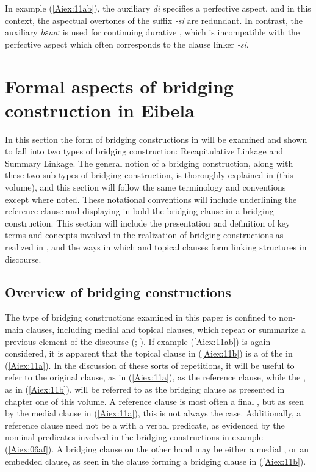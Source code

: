 \documentclass[output=paper]{LSP/langsci}
\begin{document}
In example (\ref{Aiex:11ab}), the auxiliary \textit{di} specifies a perfective aspect, and in this context, the aspectual overtones of the suffix \textit{-si} are redundant. In contrast, the auxiliary \textit{hɛnaː} is used for continuing durative , which is incompatible with the perfective aspect which often corresponds to the clause linker \textit{-si}.

\section{Formal aspects of bridging construction in Eibela} 
\label{AiFormal.aspects}
In this section the form of bridging constructions in  will be examined and shown to fall into two types of bridging construction: Recapitulative Linkage and Summary Linkage. The general notion of a bridging construction, along with these two sub-types of bridging construction, is thoroughly explained in \citeauthor{guerin18} (this volume), and this section will follow the same terminology and conventions except where noted. These notational conventions will include underlining the reference clause and displaying in bold the bridging clause in a bridging construction. This section will include the presentation and definition of key terms and concepts involved in the realization of bridging constructions as realized in , and the ways in which  and topical clauses form linking structures in  discourse. 


\subsection{Overview of bridging constructions} 
\label{AiOverview}
The type of bridging constructions examined in this paper is confined to non-main clauses, including medial and topical clauses, which repeat or summarize a previous element of the discourse (\citealt{devries.2005,devries.2006,dixon09}; \citealt[][382--383]{Thompson.et.al.2007}). If example (\ref{Aiex:11ab}) is again considered, it is apparent that the topical clause in (\ref{Aiex:11b}) is a  of the  in (\ref{Aiex:11a}). In the discussion of these sorts of repetitions, it will be useful to refer to the original clause, as in (\ref{Aiex:11a}), as the reference clause, while the , as in (\ref{Aiex:11b}), will be referred to as the bridging clause as presented in chapter one of this volume. A reference clause is most often a final , but as seen by the medial clause in (\ref{Aiex:11a}), this is not always the case. Additionally, a reference clause need not be a  with a verbal predicate, as evidenced by the nominal predicates involved in the bridging constructions in example (\ref{Aiex:06af}). A bridging clause on the other hand may be either a medial , or an embedded  clause, as seen in the  clause forming a bridging clause in (\ref{Aiex:11b}).
\end{document}
